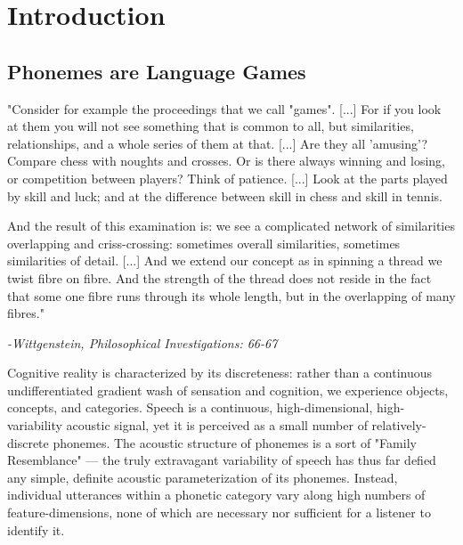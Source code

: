 

\section{Introduction}

\subsection{Phonemes are Language Games}

\begin{leftbar}

"Consider for example the proceedings that we call "games". [...] For if you look at them you will not see something that is common to all, but similarities, relationships, and a whole series of them at that. [...] Are they all 'amusing'? Compare chess with noughts and crosses. Or is there always winning and losing, or competition between players? Think of patience. [...] Look at the parts played by skill and luck; and at the difference between skill in chess and skill in tennis. 

And the result of this examination is: we see a complicated network
of similarities overlapping and criss-crossing: sometimes overall similarities, sometimes similarities of detail. [...] And we extend our concept as in spinning a thread we twist fibre on fibre. And the strength of the thread does not reside in the fact that some one fibre runs through its whole length, but in the overlapping of many fibres."

\textit{-Wittgenstein, Philosophical Investigations: 66-67\citep{wittgensteinPhilosophicalInvestigations1968}}

\end{leftbar}

Cognitive reality is characterized by its discreteness: rather than a continuous undifferentiated gradient wash of sensation and cognition, we experience objects, concepts, and categories. Speech is a continuous, high-dimensional, high-variability acoustic signal, yet it is perceived as a small number of relatively-discrete phonemes\citep{holtSpeechPerceptionCategorization2010a}. The acoustic structure of phonemes is a sort of "Family Resemblance"\citep{wittgensteinPhilosophicalInvestigations1968} --- the truly extravagant variability of speech has thus far defied any simple, definite acoustic parameterization of its phonemes. Instead, individual utterances within a phonetic category vary along high numbers of feature-dimensions, none of which are necessary nor sufficient for a listener to identify it\citep{Lisker1977,Bailey1980}.


